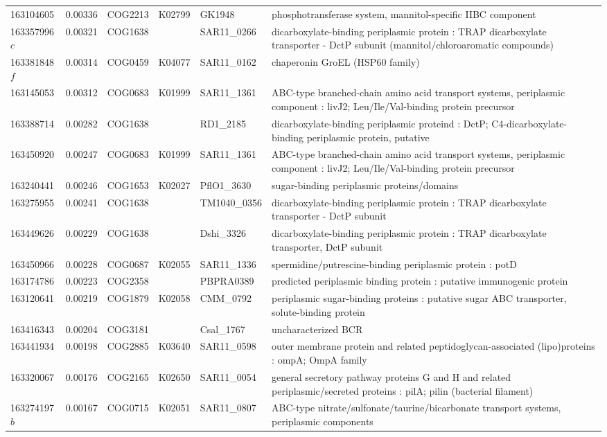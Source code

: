 \begin{landscape}
\begin{longtable}{p{1.6cm}p{1.2cm}p{1.5cm}p{1.5cm}p{2.8cm}p{13.5cm}}
163104605&0.00336&COG2213&K02799&GK1948&phosphotransferase system, mannitol-specific IIBC component \\
163357996$c$&0.00321&COG1638&&SAR11\_0266&dicarboxylate-binding periplasmic protein : TRAP dicarboxylate transporter - DctP subunit (mannitol/chloroaromatic compounds) \\
163381848$f$&0.00314&COG0459&K04077&SAR11\_0162&chaperonin GroEL (HSP60 family) \\
163145053&0.00312&COG0683&K01999&SAR11\_1361&ABC-type branched-chain amino acid transport systems, periplasmic component : livJ2; Leu/Ile/Val-binding protein precursor \\
163388714&0.00282&COG1638&&RD1\_2185&dicarboxylate-binding periplasmic proteind : DctP; C4-dicarboxylate-binding periplasmic protein, putative  \\
163450920&0.00247&COG0683&K01999&SAR11\_1361&ABC-type branched-chain amino acid transport systems, periplasmic component : livJ2; Leu/Ile/Val-binding protein precursor \\
163240441&0.00246&COG1653&K02027&PflO1\_3630&sugar-binding periplasmic proteins/domains \\
163275955&0.00241&COG1638&&TM1040\_0356&dicarboxylate-binding periplasmic protein : TRAP dicarboxylate transporter - DctP subunit \\
163449626&0.00229&COG1638&&Dshi\_3326&dicarboxylate-binding periplasmic protein : TRAP dicarboxylate transporter, DctP subunit \\
163450966&0.00228&COG0687&K02055&SAR11\_1336&spermidine/putrescine-binding periplasmic protein : potD \\
163174786&0.00223&COG2358&&PBPRA0389&predicted periplasmic binding protein : putative immunogenic protein \\
163120641&0.00219&COG1879&K02058&CMM\_0792&periplasmic sugar-binding proteins : putative sugar ABC transporter, solute-binding protein \\
163416343&0.00204&COG3181&&Csal\_1767&uncharacterized BCR \\
163441934&0.00198&COG2885&K03640&SAR11\_0598&outer membrane protein and related peptidoglycan-associated (lipo)proteins : ompA; OmpA family \\
163320067&0.00176&COG2165&K02650&SAR11\_0054&general secretory pathway proteins G and H and related periplasmic/secreted proteins : pilA; pilin (bacterial filament) \\
163274197$b$&0.00167&COG0715&K02051&SAR11\_0807&ABC-type nitrate/sulfonate/taurine/bicarbonate transport systems, periplasmic components \\

\end{longtable}
\end{landscape}
